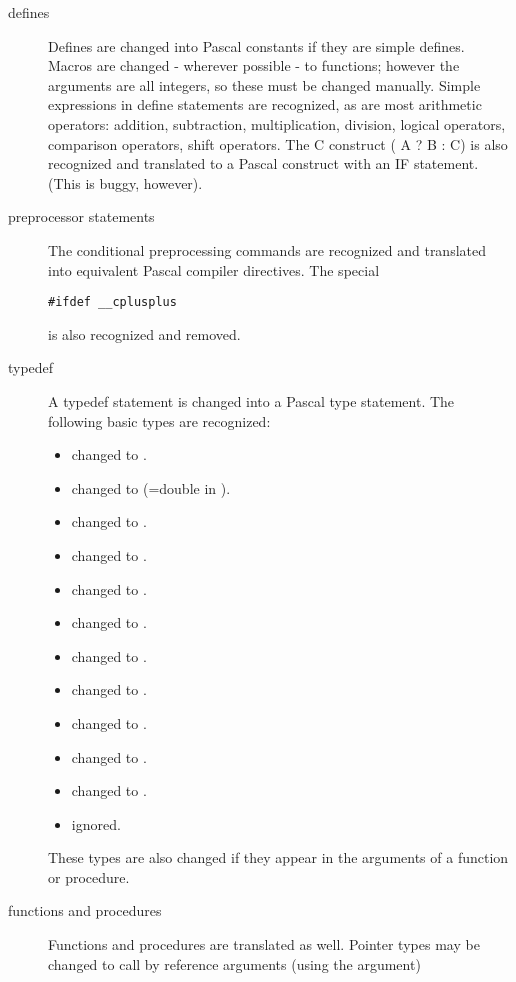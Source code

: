 \begin{description}
\item[defines]
Defines are changed into Pascal constants if they are simple defines.
Macros are changed - wherever possible - to functions; however the arguments
are all integers, so these must be changed manually. Simple expressions
in define statements are recognized, as are most arithmetic operators:
addition, subtraction, multiplication, division, logical operators,
comparison operators, shift operators. The C construct ( A ? B : C)
is also recognized and translated to a Pascal construct with an IF
statement. (This is buggy, however).

\item[preprocessor statements]
The conditional preprocessing commands are recognized and translated into
equivalent Pascal compiler directives. The special
\begin{verbatim}
#ifdef __cplusplus
\end{verbatim}
is also recognized and removed.
\item[typedef] A typedef statement is changed into a Pascal type statement.
The following basic types are recognized:
\begin{itemize}
\item {} changed to .
\item {} changed to  (=double in \fpc).
\item {} changed to .
\item {} changed to .
\item {} changed to .
\item {} changed to .
\item {} changed to .
\item {} changed to .
\item {} changed to .
\item {} changed to .
\item {} changed to .
\item {} ignored.
\end{itemize}
These types are also changed if they appear in the arguments of a function
or procedure.
\item[functions and procedures]
Functions and procedures are translated as well. Pointer types may be
changed to call by reference arguments (using the  argument)

\end{description}
